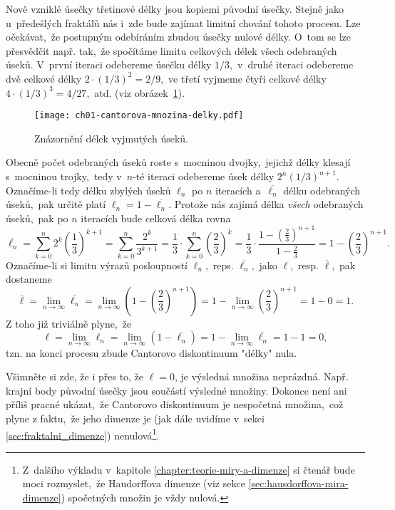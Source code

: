 Nově vzniklé úsečky třetinové délky jsou kopiemi původní úsečky. Stejně jako u~předešlých fraktálů nás i~zde bude zajímat limitní chování tohoto procesu. Lze očekávat,~že postupným odebíráním zbudou úsečky nulové délky. O~tom se lze přesvědčit např. tak,~že spočítáme limitu celkových délek všech odebraných úseků. V~první iteraci odebereme úsečku délky $1/3$,~v~druhé iteraci odebereme dvě celkové délky $2\cdot(1/3)^2=2/9$,~ve třetí vyjmeme čtyři celkové délky $4\cdot(1/3)^3=4/27$,~atd. (viz obrázek~\ref{fig:cantorovo_diskontinuum_delky}).
\begin{figure}[h]
    \centering
    \texttt{[image: ch01-cantorova-mnozina-delky.pdf]}
    \caption{Znázornění délek vyjmutých úseků.}
    \label{fig:cantorovo_diskontinuum_delky}
\end{figure}
Obecně počet odebraných úseků roste s~mocninou dvojky,~jejichž délky klesají s~mocninou trojky,~tedy v~$n$-té iteraci odebereme úsek délky $2^n(1/3)^{n+1}$. Označíme-li tedy délku zbylých úseků $\ell_n$ po $n$ iteracích a~$\overline{\ell_n}$ délku odebraných úseků,~pak určitě platí $\ell_n=1-\overline{\ell_n}$. Protože nás zajímá délka \emph{všech} odebraných úseků,~pak po $n$ iteracích bude celková délka rovna
\begin{equation}
    \overline{\ell_n}=\sum_{k=0}^{n}2^k\left(\dfrac{1}{3}\right)^{k+1}=\sum_{k=0}^{n}\dfrac{2^k}{3^{k+1}}=\dfrac{1}{3}\cdot\sum_{k=0}^{n}\left(\dfrac{2}{3}\right)^k=\dfrac{1}{3}\cdot\dfrac{1-\left(\frac{2}{3}\right)^{n+1}}{1-\frac{2}{3}}=1-\left(\dfrac{2}{3}\right)^{n+1}.
\end{equation}
Označíme-li si limitu výrazů posloupností $\ell_n$,~reps. $\overline{\ell_n}$,~jako $\ell$,~resp. $\overline{\ell}$,~pak dostaneme
\begin{equation*}
    \overline{\ell}=\lim_{n\to\infty}\overline{\ell_n}=\lim_{n\to\infty}\left(1-\left(\dfrac{2}{3}\right)^{n+1}\right)=1-\lim_{n\to\infty}\left(\dfrac{2}{3}\right)^{n+1}=1-0=1.
\end{equation*}
Z toho již triviálně plyne,~že
\begin{equation}
    \ell=\lim_{n\to\infty}\ell_n=\lim_{n\to\infty}(1-\overline{\ell_n})=1-\lim_{n\to\infty}\overline{\ell_n}=1-1=0,
\end{equation}
tzn. na konci procesu zbude Cantorovo diskontinuum "délky" nula.

Všimněte si zde, že i přes to, že $\ell=0$, je výsledná množina neprázdná. Např. krajní body původní úsečky jsou součástí výsledné množiny. Dokonce není ani příliš pracné ukázat,~že Cantorovo diskontinuum je nespočetná množina,~což plyne z faktu,~že jeho dimenze je (jak dále uvidíme v~sekci \ref{sec:fraktalni_dimenze}) nenulová\footnote{Z~dalšího výkladu v~kapitole \ref{chapter:teorie-miry-a-dimenze} si čtenář bude moci rozmyslet,~že Haudorffova dimenze (viz sekce \ref{sec:hausdorffova-mira-dimenze}) spočetných množin je vždy nulová.}.